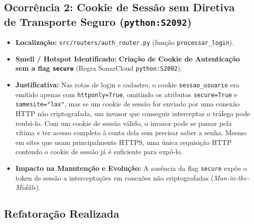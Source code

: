\documentclass[12pt,a4paper]{article}
\begin{document}
\subsection{Ocorrência 2: Cookie de Sessão sem Diretiva de Transporte Seguro (\texttt{python:S2092})}
\begin{itemize}
    \item \textbf{Localização:} \texttt{src/routers/auth\_router.py} (função \texttt{processar\_login}).

    \item \textbf{Smell / Hotspot Identificado:} \textbf{Criação de Cookie de Autenticação sem a flag \texttt{secure}} (Regra SonarCloud \texttt{python:S2092}).
    
    \item \textbf{Justificativa:} Nas rotas de login e cadastro, o cookie \texttt{sessao\_usuario} era emitido apenas com \texttt{httponly=True}, omitindo os atributos \texttt{secure=True} e \texttt{samesite="lax"}, mas se um cookie de sessão for enviado por uma conexão HTTP não criptografada, um invasor que conseguir interceptar o tráfego pode roubá-lo. Com um cookie de sessão válido, o invasor pode se passar pela vítima e ter acesso completo à conta dela sem precisar saber a senha. Mesmo em sites que usam principalmente HTTPS, uma única requisição HTTP contendo o cookie de sessão já é suficiente para expô-lo.
    
    \item \textbf{Impacto na Manutenção e Evolução:} A ausência da flag \texttt{secure} expõe o token de sessão a interceptações em conexões não criptografadas (\textit{Man-in-the-Middle}).
\end{itemize}
\subsection{Refatoração Realizada}
\end{document}
